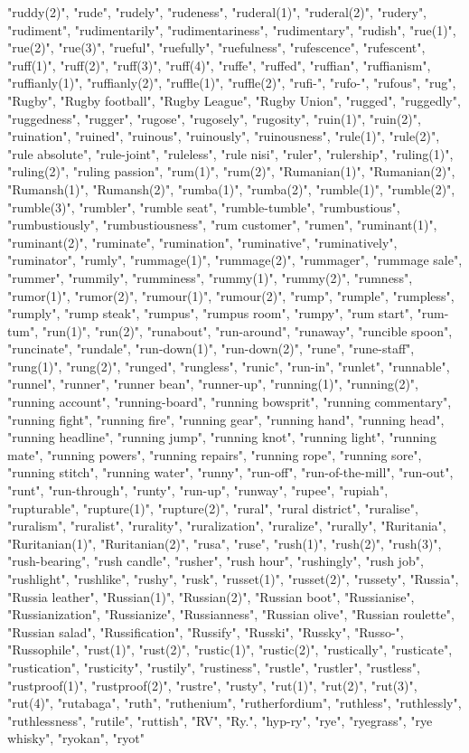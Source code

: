 "ruddy(2)",
"rude",
"rudely",
"rudeness",
"ruderal(1)",
"ruderal(2)",
"rudery",
"rudiment",
"rudimentarily",
"rudimentariness",
"rudimentary",
"rudish",
"rue(1)",
"rue(2)",
"rue(3)",
"rueful",
"ruefully",
"ruefulness",
"rufescence",
"rufescent",
"ruff(1)",
"ruff(2)",
"ruff(3)",
"ruff(4)",
"ruffe",
"ruffed",
"ruffian",
"ruffianism",
"ruffianly(1)",
"ruffianly(2)",
"ruffle(1)",
"ruffle(2)",
"rufi-",
"rufo-",
"rufous",
"rug",
"Rugby",
"Rugby football",
"Rugby League",
"Rugby Union",
"rugged",
"ruggedly",
"ruggedness",
"rugger",
"rugose",
"rugosely",
"rugosity",
"ruin(1)",
"ruin(2)",
"ruination",
"ruined",
"ruinous",
"ruinously",
"ruinousness",
"rule(1)",
"rule(2)",
"rule absolute",
"rule-joint",
"ruleless",
"rule nisi",
"ruler",
"rulership",
"ruling(1)",
"ruling(2)",
"ruling passion",
"rum(1)",
"rum(2)",
"Rumanian(1)",
"Rumanian(2)",
"Rumansh(1)",
"Rumansh(2)",
"rumba(1)",
"rumba(2)",
"rumble(1)",
"rumble(2)",
"rumble(3)",
"rumbler",
"rumble seat",
"rumble-tumble",
"rumbustious",
"rumbustiously",
"rumbustiousness",
"rum customer",
"rumen",
"ruminant(1)",
"ruminant(2)",
"ruminate",
"rumination",
"ruminative",
"ruminatively",
"ruminator",
"rumly",
"rummage(1)",
"rummage(2)",
"rummager",
"rummage sale",
"rummer",
"rummily",
"rumminess",
"rummy(1)",
"rummy(2)",
"rumness",
"rumor(1)",
"rumor(2)",
"rumour(1)",
"rumour(2)",
"rump",
"rumple",
"rumpless",
"rumply",
"rump steak",
"rumpus",
"rumpus room",
"rumpy",
"rum start",
"rum-tum",
"run(1)",
"run(2)",
"runabout",
"run-around",
"runaway",
"runcible spoon",
"runcinate",
"rundale",
"run-down(1)",
"run-down(2)",
"rune",
"rune-staff",
"rung(1)",
"rung(2)",
"runged",
"rungless",
"runic",
"run-in",
"runlet",
"runnable",
"runnel",
"runner",
"runner bean",
"runner-up",
"running(1)",
"running(2)",
"running account",
"running-board",
"running bowsprit",
"running commentary",
"running fight",
"running fire",
"running gear",
"running hand",
"running head",
"running headline",
"running jump",
"running knot",
"running light",
"running mate",
"running powers",
"running repairs",
"running rope",
"running sore",
"running stitch",
"running water",
"runny",
"run-off",
"run-of-the-mill",
"run-out",
"runt",
"run-through",
"runty",
"run-up",
"runway",
"rupee",
"rupiah",
"rupturable",
"rupture(1)",
"rupture(2)",
"rural",
"rural district",
"ruralise",
"ruralism",
"ruralist",
"rurality",
"ruralization",
"ruralize",
"rurally",
"Ruritania",
"Ruritanian(1)",
"Ruritanian(2)",
"rusa",
"ruse",
"rush(1)",
"rush(2)",
"rush(3)",
"rush-bearing",
"rush candle",
"rusher",
"rush hour",
"rushingly",
"rush job",
"rushlight",
"rushlike",
"rushy",
"rusk",
"russet(1)",
"russet(2)",
"russety",
"Russia",
"Russia leather",
"Russian(1)",
"Russian(2)",
"Russian boot",
"Russianise",
"Russianization",
"Russianize",
"Russianness",
"Russian olive",
"Russian roulette",
"Russian salad",
"Russification",
"Russify",
"Russki",
"Russky",
"Russo-",
"Russophile",
"rust(1)",
"rust(2)",
"rustic(1)",
"rustic(2)",
"rustically",
"rusticate",
"rustication",
"rusticity",
"rustily",
"rustiness",
"rustle",
"rustler",
"rustless",
"rustproof(1)",
"rustproof(2)",
"rustre",
"rusty",
"rut(1)",
"rut(2)",
"rut(3)",
"rut(4)",
"rutabaga",
"ruth",
"ruthenium",
"rutherfordium",
"ruthless",
"ruthlessly",
"ruthlessness",
"rutile",
"ruttish",
"RV",
"Ry.",
"hyp-ry",
"rye",
"ryegrass",
"rye whisky",
"ryokan",
"ryot"
